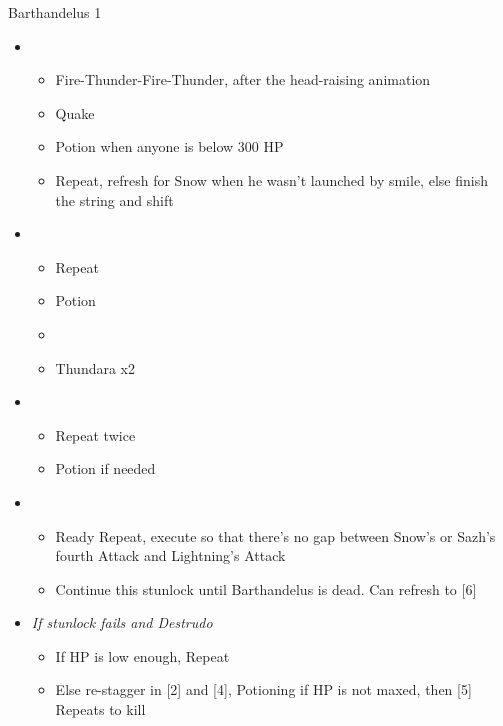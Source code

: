\begin{battle}[2:15]{Barthandelus 1}
\begin{itemize}
\begin{itemize}
				      \item Potion while Barthandelus's head is up in the air
			      \end{itemize}
			\item \second
			      \begin{itemize}
				      \item Fire-Thunder-Fire-Thunder, after the head-raising animation
				      \item Quake
				      \item Potion when anyone is below 300 HP
				      \item Repeat, refresh for Snow when he wasn't launched by smile, else finish the string and shift
			      \end{itemize}
			\item \third
			      \begin{itemize}
				      \item Repeat
				      \item Potion
				      \item \stagger
				      \item Thundara x2
			      \end{itemize}
			\item \second
			      \begin{itemize}
				      \item Repeat twice
				      \item Potion if needed
			      \end{itemize}
			\item \fourth
			      \begin{itemize}
				      \item Ready Repeat, execute so that there's no gap between Snow's or Sazh's fourth Attack and Lightning's Attack
				      \item Continue this stunlock until Barthandelus is dead. Can refresh to [6]
			      \end{itemize}
			\item \textit{If stunlock fails and Destrudo}
			      \begin{itemize}
				      \item If HP is low enough, Repeat
				      \item Else re-stagger in [2] and [4], Potioning if HP is not maxed, then [5] Repeats to kill
			      \end{itemize}
		\end{itemize}
\end{battle}
\vfill
\ 
\columnbreak

